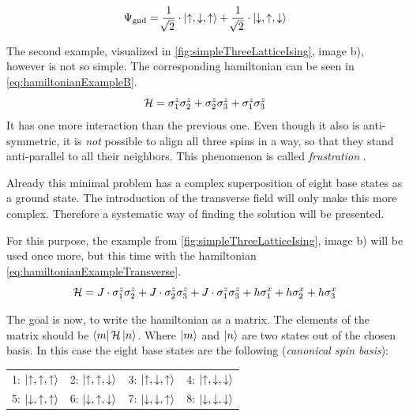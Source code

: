 \begin{equation}
    \label{eq:solutionSimpleExample}
    \Psi_\mathrm{gnd} = \frac{1}{\sqrt[]{2}} \cdot \ket{\uparrow, \downarrow, \uparrow} +  \frac{1}{\sqrt[]{2}} \cdot \ket{\downarrow, \uparrow, \downarrow}
\end{equation}

The second example, visualized in \autoref{fig:simpleThreeLatticeIsing}, image b), however is not so simple. The corresponding hamiltonian can be seen in \ref{eq:hamiltonianExampleB}.
\begin{equation}
    \label{eq:hamiltonianExampleB}
    \mathcal{H} = \sigma^z_1\sigma^z_2 +\sigma^z_2\sigma^z_3 +\sigma^z_1\sigma^z_3
\end{equation}
It has one more interaction than the previous one. Even though it also is anti-symmetric, it is \emph{not} possible to align all three spins in a way, so that they stand anti-parallel to all their neighbors. This phenomenon is called \emph{frustration} \cite*{frustration}.

Already this minimal problem has a complex superposition of eight base states as a ground state. The introduction of the transverse field will only make this more complex. Therefore a systematic way of finding the solution will be presented.

For this purpose, the example from \autoref{fig:simpleThreeLatticeIsing}, image b) will be used once more, but this time with the hamiltonian \ref{eq:hamiltonianExampleTransverse}.
\begin{equation}
    \label{eq:hamiltonianExampleTransverse}
    \mathcal{H} = J\cdot \sigma^z_1\sigma^z_2 +J\cdot\sigma^z_2\sigma^z_3 +J\cdot\sigma^z_1\sigma^z_3
    +h \sigma^x_1+h \sigma^x_2+h \sigma^x_3
\end{equation}

The goal is now, to write the hamiltonian \hamiltonian as a matrix. 
The elements of the matrix should be $\bra{m}\mathcal{H}\ket{n}$. Where $\ket{m}$ and $\ket{n}$ are two states out of the chosen basis. In this case the eight base states are the following (\emph{canonical spin basis}):

\begin{center}
    \begin{tabular}{llll} 
        1: $\ket{\uparrow, \uparrow, \uparrow}$ & 2: $\ket{\uparrow, \uparrow, \downarrow}$  & 3: $\ket{\uparrow, \downarrow, \uparrow}$  & 4: $\ket{\uparrow, \downarrow, \downarrow}$ \\
        5: $\ket{\downarrow, \uparrow, \uparrow}$ & 6: $\ket{\downarrow, \uparrow, \downarrow}$  & 7: $\ket{\downarrow, \downarrow, \uparrow}$  & 8: $\ket{\downarrow, \downarrow, \downarrow}$ 
    \end{tabular}
\end{center}

